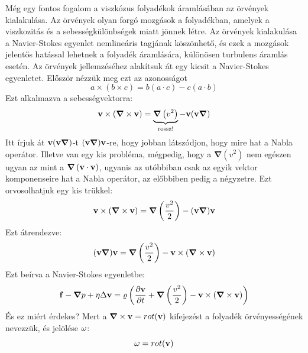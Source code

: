 \documentclass[a4paper,12pt]{article}
\begin{document}
Még egy fontos fogalom a viszkózus folyadékok áramlásában az örvények kialakulása. Az örvények olyan forgó mozgások a folyadékban, amelyek a viszkozitás és a sebességkülönbségek miatt jönnek létre.
Az örvények kialakulása a Navier-Stokes egyenlet nemlineáris tagjának köszönhető, és ezek a mozgások jelentős hatással lehetnek a folyadék áramlására, különösen turbulens áramlás esetén.
Az örvények jellemzéséhez alakítsuk át egy kicsit a Navier-Stokes egyenletet. Először nézzük meg ezt az azonosságot
\begin{equation}
    a \times (b \times c) = b(a \cdot c) - c(a \cdot b)
\end{equation}
Ezt alkalmazva a sebességvektorra:
\begin{equation}
    \bold{v} \times (\boldsymbol{\nabla} \times \bold{v}) = \underbrace{\boldsymbol{\nabla} \left(v^2\right)}_{\text{rossz!}} - \bold{v} (\bold{v} \boldsymbol{\nabla})
\end{equation}
Itt írjuk át $\bold{v} (\bold{v} \boldsymbol{\nabla})$-t $(\bold{v} \boldsymbol{\nabla})\bold{v}$-re, hogy jobban látszódjon, hogy mire hat a Nabla operátor. Illetve van egy kis probléma,
mégpedig, hogy a $\boldsymbol{\nabla} \left(v^2\right)$ nem egészen ugyan az mint a $\boldsymbol{\nabla} \left(\bold{v} \cdot \bold{v}\right)$, ugyanis az utóbbiban csak az egyik vektor komponenseire hat a Nabla operátor,
az előbbiben pedig a négyzetre. Ezt orvosolhatjuk egy kis trükkel:
\begin{equation}
    \bold{v} \times (\boldsymbol{\nabla} \times \bold{v}) = \boldsymbol{\nabla} \left(\frac{v^2}{2}\right) - (\bold{v} \boldsymbol{\nabla})\bold{v}
\end{equation}
Ezt átrendezve:
\begin{equation}
    (\bold{v} \boldsymbol{\nabla})\bold{v} = \boldsymbol{\nabla} \left(\frac{v^2}{2}\right) - \bold{v} \times (\boldsymbol{\nabla} \times \bold{v})
\end{equation}
Ezt beírva a Navier-Stokes egyenletbe:
\begin{equation}
    \bold{f} - \boldsymbol{\nabla} p + \eta \Delta \bold{v} = \varrho \left(\frac{\partial \bold{v}}{\partial t} + \boldsymbol{\nabla} \left(\frac{v^2}{2}\right) - \bold{v} \times (\boldsymbol{\nabla} \times \bold{v})\right)
\end{equation}
És ez miért érdekes? Mert a $\boldsymbol{\nabla} \times \bold{v} = rot(\bold{v})$ kifejezést a folyadék örvényességének nevezzük, és jelölése $\bold{\omega}$:
\begin{equation}
    \bold{\omega} = rot(\bold{v})
\end{equation}
\end{document}
